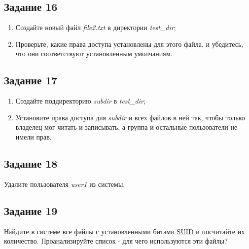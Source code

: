 \documentclass[12pt, a4paper]{report}
\begin{document}
	\subsection*{Задание 16}
	\begin{enumerate}
		\item Создайте новый файл \textit{file2.txt} в директории \textit{test\_dir};
		\item Проверьте, какие права доступа установлены для этого файла, и убедитесь, что они соответствуют установленным умолчаниям.
	\end{enumerate}
	\lstset{style=mystyle}
	

	\subsection*{Задание 17}
	\begin{enumerate}
		\item Создайте поддиректорию \textit{subdir} в \textit{test\_dir};
		\item Установите права доступа для \textit{subdir} и всех файлов в ней так, чтобы только владелец мог читать и записывать, а группа и остальные пользователи не имели прав.
	\end{enumerate}
	\lstset{style=mystyle}
	

	\subsection*{Задание 18}
	Удалите пользователя \textit{user1} из системы.
	\lstset{style=mystyle}
	

	\subsection*{Задание 19}
	Найдите в системе все файлы с установленными битами \underline{SUID} и посчитайте их количество. Проанализируйте список - для чего используются эти файлы?
	\lstset{style=mystyle}
	
\end{document}
